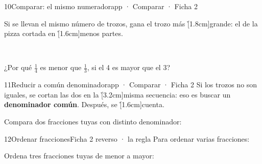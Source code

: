 \documentclass[12pt]{article}
\begin{document}
\begin{cromo}{10}{Comparar: el mismo numerador}{app · Comparar · Ficha 2}
\begin{minipage}[c]{.6\linewidth}\raggedright
\completa Si se llevan el mismo número de trozos, gana el trozo más \h[1.8cm]{grande}: el de la pizza cortada en \h[1.6cm]{menos} partes.
\end{minipage}%
\begin{minipage}[c]{.4\linewidth}\centering{}\ \end{minipage}

\vspace{2mm}
\palabras ¿Por qué $\frac{1}{4}$ es menor que $\frac{1}{3}$, si el 4 es mayor que el 3?
\end{cromo}

\begin{cromo}{11}{Reducir a común denominador}{app · Comparar · Ficha 2}
\completa Si los trozos no son iguales, se cortan las dos en la \h[3.2cm]{misma secuencia}: eso es buscar un \textbf{denominador común}. Después, se \h[1.6cm]{cuenta}.

\vspace{2mm}
\tuejemplo Compara dos fracciones tuyas con distinto denominador:
\end{cromo}

\begin{cromo}{12}{Ordenar fracciones}{Ficha 2 reverso · la regla}
\completa Para ordenar varias fracciones:

\tuejemplo Ordena tres fracciones tuyas de menor a mayor:
\end{cromo}
\end{document}
